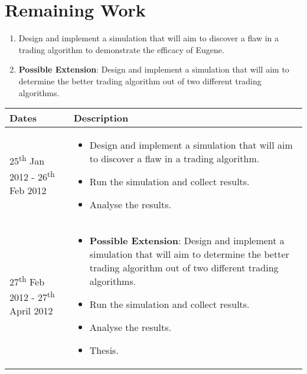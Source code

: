 \documentclass[10pt,a4paper]{article}
\begin{document}
\section*{Remaining Work}
\begin{enumerate}
\item Design and implement a simulation that will aim to discover a flaw in a trading algorithm to demonstrate the efficacy of Eugene.
\item \textbf{Possible Extension}: Design and implement a simulation that will aim to determine the better trading algorithm out of two different trading algorithms. 
\end{enumerate}

\begin{center}
\begin{tabular}{ p{1.4in} p{3in} }

                
        \multicolumn{1}{l}{\textbf{Dates}}                               		 &
        \multicolumn{1}{l}{\textbf{Description}}                               \\
        \toprule


        25\textsuperscript{th} Jan 2012 - 26\textsuperscript{th} Feb 2012 &
        \begin{itemize}
        \item Design and implement a simulation that will aim to discover a flaw in a trading algorithm.
        \item Run the simulation and collect results.
        \item Analyse the results.
        \end{itemize}
        \\
        
        27\textsuperscript{th} Feb 2012 - 27\textsuperscript{th} April 2012 &
        \begin{itemize}
        \item \textbf{Possible Extension}: Design and implement a simulation that will aim to determine the better trading algorithm out of two different trading algorithms.
        \item Run the simulation and collect results.
        \item Analyse the results.
        \item Thesis.
        \end{itemize}
        \\
\end{tabular}
\end{center}
\end{document}
